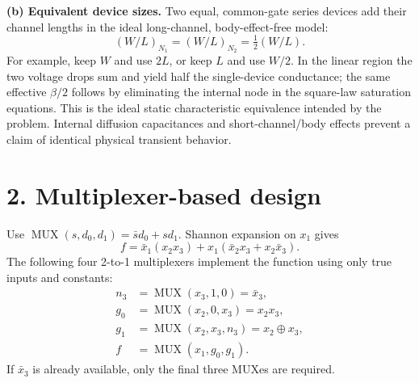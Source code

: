 \documentclass[11pt]{article}
\begin{document}
\textbf{(b) Equivalent device sizes.} Two equal, common-gate series devices add their channel lengths in the ideal long-channel, body-effect-free model:
\[
 \boxed{(W/L)_{N_1}=(W/L)_{N_2}=\tfrac12(W/L).}
\]
For example, keep $W$ and use $2L$, or keep $L$ and use $W/2$. In the linear region the two voltage drops sum and yield half the single-device conductance; the same effective $\beta/2$ follows by eliminating the internal node in the square-law saturation equations. This is the ideal static characteristic equivalence intended by the problem. Internal diffusion capacitances and short-channel/body effects prevent a claim of identical physical transient behavior.

\newpage
\section*{2. Multiplexer-based design}
Use $\operatorname{MUX}(s,d_0,d_1)=\bar{s}d_0+sd_1$. Shannon expansion on $x_1$ gives
\[
 f=\bar{x}_1(x_2x_3)+x_1(\bar{x}_2x_3+x_2\bar{x}_3).
\]
The following four 2-to-1 multiplexers implement the function using only true inputs and constants:
\begin{align*}
 n_3&=\operatorname{MUX}(x_3,1,0)=\bar{x}_3,\\
 g_0&=\operatorname{MUX}(x_2,0,x_3)=x_2x_3,\\
 g_1&=\operatorname{MUX}(x_2,x_3,n_3)=x_2\oplus x_3,\\
 f&=\operatorname{MUX}(x_1,g_0,g_1).
\end{align*}
If $\bar{x}_3$ is already available, only the final three MUXes are required.
\begin{center}\end{center}
\end{document}
